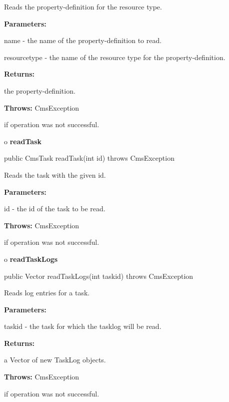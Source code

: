 \begin{description}
\htmlDD Reads the property-definition for the resource type.

\begin{description}
\item {\bf Parameters:}

name - the name of the property-definition to read.

resourcetype - the name of the resource type for the property-definition.
\item {\bf Returns:}

the property-definition.
\item {\bf Throws:} CmsException

if operation was not successful.
\end{description}

\end{description}

o {\bf readTask}

\begin{PRE}
 public CmsTask readTask(int id) throws CmsException
\end{PRE}

\begin{description}
\htmlDD Reads the task with the given id.

\begin{description}
\item {\bf Parameters:}

id - the id of the task to be read.
\item {\bf Throws:} CmsException

if operation was not successful.
\end{description}

\end{description}

o {\bf readTaskLogs}

\begin{PRE}
 public Vector readTaskLogs(int taskid) throws CmsException
\end{PRE}

\begin{description}
\htmlDD Reads log entries for a task.

\begin{description}
\item {\bf Parameters:}

taskid - the task for which the tasklog will be read.
\item {\bf Returns:}

a Vector of new TaskLog objects.
\item {\bf Throws:} CmsException

if operation was not successful.
\end{description}

\end{description}

